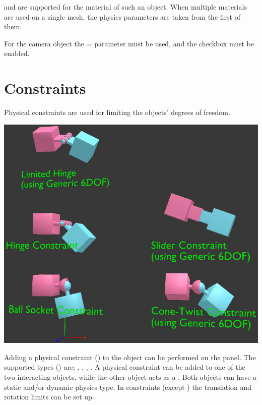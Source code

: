 \documentclass[a4paper,12pt,oneside]{sphinxmanual}
\begin{document}
\begin{DUlineblock}{0em}
\item[] 
\end{DUlineblock}

 and  are supported for the material of such an object. When multiple materials are used on a single mesh, the physics parameters are taken from the first of them.

For the camera object the  =  parameter must be used, and the  checkbox must be enabled.


\section{Constraints}
\label{physics:constraints}
Physical constraints are used for limiting the objects' degrees of freedom.

\includegraphics[width=1.000\linewidth]{physics_constraints.jpg}

\begin{DUlineblock}{0em}
\item[] 
\end{DUlineblock}

Adding a physical constraint () to the object can be performed on the  panel. The supported types () are: , , , . A physical constraint can be added to one of the two interacting objects, while the other object acts as a . Both objects can have a static and/or dynamic physics type. In constraints (except ) the translation and rotation limits can be set up.
\end{document}
